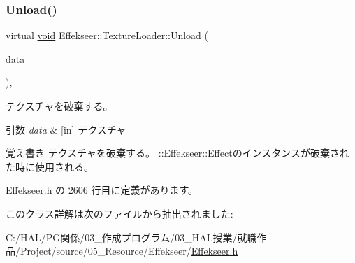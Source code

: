 \subsubsection{\texorpdfstring{Unload()}{Unload()}}
{\footnotesize\ttfamily virtual \mbox{\hyperlink{namespace_effekseer_ab34c4088e512200cf4c2716f168deb56}{void}} Effekseer\+::\+Texture\+Loader\+::\+Unload (\begin{DoxyParamCaption}\item[{\mbox{\hyperlink{struct_effekseer_1_1_texture_data}{Texture\+Data}} $\ast$}]{data }\end{DoxyParamCaption})\hspace{0.3cm}{\ttfamily [inline]}, {\ttfamily [virtual]}}



テクスチャを破棄する。 


\begin{DoxyParams}{引数}
{\em data} & \mbox{[}in\mbox{]} テクスチャ \\
\hline
\end{DoxyParams}
\begin{DoxyNote}{覚え書き}
テクスチャを破棄する。 \+::\+Effekseer\+::\+Effectのインスタンスが破棄された時に使用される。 
\end{DoxyNote}


 Effekseer.\+h の 2606 行目に定義があります。



このクラス詳解は次のファイルから抽出されました\+:\begin{DoxyCompactItemize}
\item 
C\+:/\+H\+A\+L/\+P\+G関係/03\+\_\+作成プログラム/03\+\_\+\+H\+A\+L授業/就職作品/\+Project/source/05\+\_\+\+Resource/\+Effekseer/\mbox{\hyperlink{_effekseer_8h}{Effekseer.\+h}}\end{DoxyCompactItemize}
